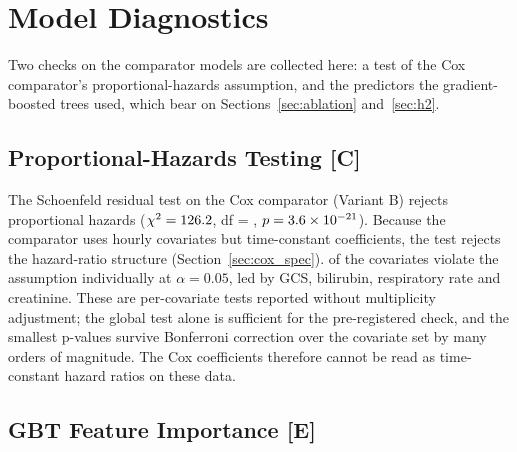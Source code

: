 

\section{Model Diagnostics}
\label{sec:model_diagnostics}

Two checks on the comparator models are collected here: a test of the Cox
comparator's proportional-hazards assumption, and the predictors the
gradient-boosted trees used, which bear on Sections~\ref{sec:ablation}
and~\ref{sec:h2}.

\subsection{Proportional-Hazards Testing \texorpdfstring{[C]}{[C]}}
\label{sec:schoenfeld}

The Schoenfeld residual test on the Cox comparator (Variant B) rejects
proportional hazards ($\chi^2 = 126.2$, df = \pcSchoenfeldDf,
$p = 3.6\times 10^{-21}$). Because the comparator uses hourly covariates but
time-constant coefficients, the test rejects the hazard-ratio structure
(Section~\ref{sec:cox_spec}).
\pcSchoenfeldNViolate{} of the \pcSchoenfeldNCovariates{} covariates violate
the assumption individually at $\alpha = 0.05$, led by GCS, bilirubin,
respiratory rate and creatinine. These are per-covariate tests reported without
multiplicity adjustment; the global test alone is sufficient for the
pre-registered check, and the smallest p-values survive Bonferroni correction
over the covariate set by many orders of magnitude. The Cox coefficients
therefore cannot be read as time-constant hazard ratios on these data.

\subsection{GBT Feature Importance \texorpdfstring{[E]}{[E]}}
\label{sec:feature_importance}

